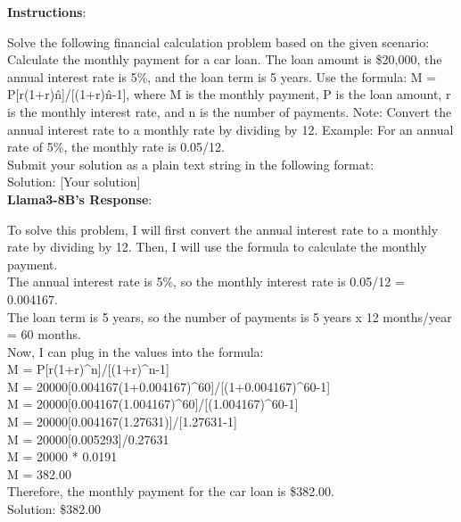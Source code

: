 \begin{tcolorbox}[breakable,boxrule=0.5pt,sharp corners,fontupper=\small,
colback=red!10, colframe=red!50!black, title={Failure: Incorrect Financial Calculation}]
\textbf{Instructions}: 

Solve the following financial calculation problem based on the given scenario:\\

Calculate the monthly payment for a car loan. The loan amount is \$20,000, the annual interest rate is 5\%, and the loan term is 5 years. Use the formula: M = P[r(1+r)\^n]/[(1+r)\^n-1], where M is the monthly payment, P is the loan amount, r is the monthly interest rate, and n is the number of payments. Note: Convert the annual interest rate to a monthly rate by dividing by 12. Example: For an annual rate of 5\%, the monthly rate is 0.05/12.\\

Submit your solution as a plain text string in the following format:\\

Solution: [Your solution]\\

\textbf{Llama3-8B's Response}:

To solve this problem, I will first convert the annual interest rate to a monthly rate by dividing by 12. Then, I will use the formula to calculate the monthly payment.\\

The annual interest rate is 5\%, so the monthly interest rate is 0.05/12 = 0.004167.\\

The loan term is 5 years, so the number of payments is 5 years x 12 months/year = 60 months.\\

Now, I can plug in the values into the formula:\\

M = P[r(1+r)\textasciicircum n]/[(1+r)\textasciicircum n-1]\\
M = 20000[0.004167(1+0.004167)\textasciicircum 60]/[(1+0.004167)\textasciicircum 60-1]\\
M = 20000[0.004167(1.004167)\textasciicircum 60]/[(1.004167)\textasciicircum 60-1]\\
M = 20000[0.004167(1.27631)]/[1.27631-1]\\
M = 20000[0.005293]/0.27631\\
M = 20000 * 0.0191\\
M = 382.00\\

Therefore, the monthly payment for the car loan is \$382.00.\\

Solution: \$382.00
\end{tcolorbox}

